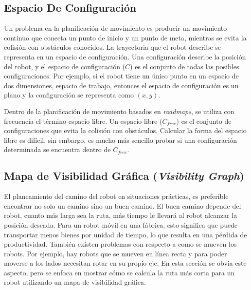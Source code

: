 \subsection{Espacio De Configuraci\'on}

Un problema en la planificaci\'on de movimiento es producir un movimiento continuo que conecta un punto de inicio y un punto de meta, mientras se evita la colisi\'on con obst\'aculos conocidos. La trayectoria que el robot describe se representa en un espacio de configuraci\'on. Una configuraci\'on describe la posici\'on del robot, y el espacio de configuraci\'on ($C$) es el conjunto de todas las posibles configuraciones. Por ejemplo, si el robot tiene un \'unico punto en un espacio de dos dimensiones, espacio de trabajo, entonces el espacio de configuraci\'on es un plano y la configuraci\'on se representa como $(x,y)$.

Dentro de la planificaci\'on de movimiento basados en \textit{roadmaps}, se utiliza con frecuencia el t\'ermino espacio libre. Un espacio libre ($C_{free}$) es el conjunto de configuraciones que evita la colisi\'on con obst\'aculos. Calcular la forma del espacio libre es dif\'icil, sin embargo, es mucho m\'as sencillo probar si una configuraci\'on determinada se encuentra dentro de $C_{free}$. 

\subsection{Mapa de Visibilidad Gr\'afica (\textit{Visibility Graph})}

El planeamiento del camino del robot en situaciones pr\'acticas, es preferible encontrar no solo un camino sino un buen camino. El buen camino depende del robot, cuanto m\'as larga sea la ruta, m\'as tiempo le llevar\'a al robot alcanzar la posici\'on deseada. Para un robot m\'ovil en una f\'abrica, esto significa que puede transportar menos bienes por unidad de tiempo, lo que resulta en una p\'erdida de productividad. Tambi\'en existen problemas con respecto a como se mueven los robots. Por ejemplo, hay robots que se mueven en l\'inea recta y para poder moverse a los lados necesitan rotar en su propio eje. En esta secci\'on se obvia este aspecto, pero se enfoca en mostrar c\'omo se calcula la ruta m\'as corta para un robot utilizando un mapa de visibilidad gr\'afica.


